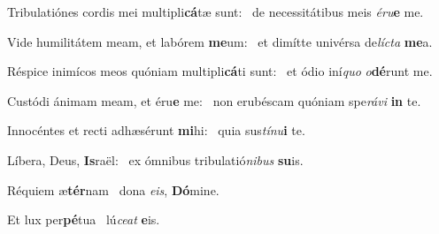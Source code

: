 \item Tribulatiónes cordis mei multipli\textbf{cá}tæ sunt:~\psstar{} de necessitátibus meis \textit{éru}\textbf{e} me.
\item Vide humilitátem meam, et labórem \textbf{me}um:~\psstar{} et dimítte univérsa de\textit{lícta} \textbf{me}a.
\item Réspice inimícos meos quóniam multipli\textbf{cá}ti sunt:~\psstar{} et ódio iní\textit{quo} \textit{o}\textbf{dé}runt me.
\item Custódi ánimam meam, et éru\textbf{e} me:~\psstar{} non erubéscam quóniam spe\textit{rávi} \textbf{in} te.
\item Innocéntes et recti adhæsérunt \textbf{mi}hi:~\psstar{} quia sus\textit{tínu}\textbf{i} te.
\item Líbera, Deus, \textbf{Is}raël:~\psstar{} ex ómnibus tribulatió\textit{nibus} \textbf{su}is.
\item Réquiem æ\textbf{tér}nam~\psstar{} dona \textit{eis}, \textbf{Dó}mine.
\item Et lux per\textbf{pé}tua~\psstar{} lú\textit{ceat} \textbf{e}is.